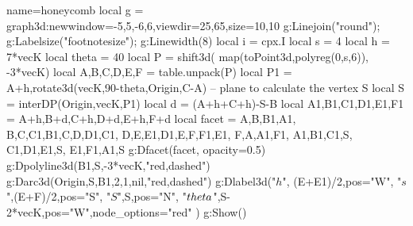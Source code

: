 \documentclass[12pt]{standalone}
\begin{document}
\begin{luadraw}{name=honeycomb}
local g = graph3d:new{window={-5,5,-6,6},viewdir={25,65},size={10,10}}
g:Linejoin("round"); g:Labelsize("footnotesize"); g:Linewidth(8)
local i = cpx.I
local s = 4
local h = 7*vecK
local theta = 40
local P = shift3d( map(toPoint3d,polyreg(0,s,6)), -3*vecK)
local A,B,C,D,E,F = table.unpack(P)
local P1 = {A+h,rotate3d(vecK,90-theta,{Origin,C-A})} -- plane to calculate the vertex S
local S = interDP({Origin,vecK},P1)
local d = (A+h+C+h)-S-B
local A1,B1,C1,D1,E1,F1 = A+h,B+d,C+h,D+d,E+h,F+d
local facet = {{A,B,B1,A1}, {B,C,C1,B1},{C,D,D1,C1}, {D,E,E1,D1},{E,F,F1,E1}, {F,A,A1,F1}, {A1,B1,C1,S}, {C1,D1,E1,S}, {E1,F1,A1,S}}
g:Dfacet(facet, {opacity=0.5})
g:Dpolyline3d({B1,S,-3*vecK},"red,dashed")
g:Darc3d(Origin,S,B1,2,1,nil,"red,dashed")
g:Dlabel3d("$h$", (E+E1)/2,{pos="W"}, "$s$",(E+F)/2,{pos="S"}, "$S$",S,{pos="N"},
    "$\\theta$",S-2*vecK,{pos="W",node_options="red"} )
g:Show()
\end{luadraw}
\end{document}
